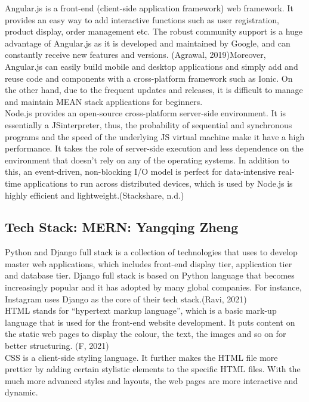 \documentclass[a4paper, 11pt]{report}
\begin{document}
\noindent Angular.js is a front-end (client-side application framework) web framework. It provides an easy way to add interactive functions such as user registration, product display, order management etc. The robust community support is a huge advantage of Angular.js as it is developed and maintained by Google, and can constantly receive new features and versions. (Agrawal, 2019)Moreover, Angular.js can easily build mobile and desktop applications and simply add and reuse code and components with a cross-platform framework such as Ionic. On the other hand, due to the frequent updates and releases, it is difficult to manage and maintain MEAN stack applications for beginners.\\

\noindent Node.js provides an open-source cross-platform server-side environment. It is essentially a JSinterpreter, thus, the probability of sequential and synchronous programs and the speed of the underlying JS virtual machine make it have a high performance. It takes the role of server-side execution and less dependence on the environment that doesn’t rely on any of the operating systems. In addition to this, an event-driven, non-blocking I/O model is perfect for data-intensive real-time applications to run across distributed devices, which is used by Node.js is highly efficient and lightweight.(Stackshare, n.d.)\\

\subsection{Tech Stack: MERN: Yangqing Zheng}

\noindent Python and Django full stack is a collection of technologies that uses to develop master web applications, which includes front-end display tier, application tier and database tier. Django full stack is based on Python language that becomes increasingly popular and it has adopted by many global companies. For instance, Instagram uses Django as the core of their tech stack.(Ravi,  2021)\\

\noindent HTML stands for “hypertext markup language”, which is a basic mark-up language that is used for the front-end website development. It puts content on the static web pages to display the colour, the text, the images and so on for better structuring. (F, 2021)\\

\noindent CSS is a client-side styling language. It further makes the HTML file more prettier by adding certain stylistic elements to the specific HTML files. With the much more advanced styles and layouts, the web pages are more interactive and dynamic.\\
\end{document}
